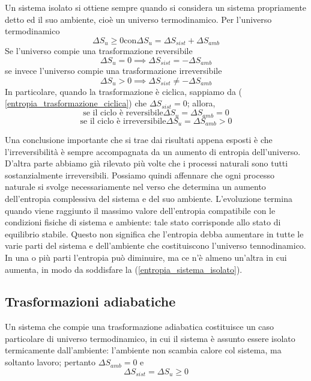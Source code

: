 \documentclass[class=book, crop=false, oneside, 12pt]{standalone}
\begin{document}
Un sistema isolato si ottiene sempre quando si considera un sistema propriamente detto ed il suo ambiente, cioè un universo termodinamico. 
Per l'universo termodinamico
\begin{equation*}
    \Delta S_u \geq 0 \text{con} \Delta S_u = \Delta S_{sist} + \Delta S_{amb}
\end{equation*}
Se l'universo compie una trasformazione reversibile 
\begin{equation*}
    \Delta S_u = 0 \implies \Delta S_{sist} = - \Delta S_{amb}
\end{equation*}
se invece l'universo compie una trasformazione irreversibile
\begin{equation*}
    \Delta S_u > 0 \implies \Delta S_{sist} \neq -\Delta S_{amb}
\end{equation*}
In particolare, quando la trasformazione è ciclica, sappiamo da ( \ref{entropia_trasformazione_ciclica}) che \(\Delta S_{sist}  =0\); allora,
\begin{equation*}
    \text{se il ciclo è reversibile} \Delta S_u = \Delta S_{amb} = 0
\end{equation*}
\begin{equation*}
    \text{se il ciclo è irreversibile} \Delta S_u = \Delta S_{amb} > 0 
\end{equation*}

Una conclusione importante che si trae dai risultati appena esposti è che l'irreversibilità è sempre accompagnata da un aumento di entropia dell'universo. 
D'altra parte abbiamo già rilevato più volte che i processi naturali sono tutti sostanzialmente irreversibili. 
Possiamo quindi affennare che ogni processo naturale si svolge necessariamente nel verso che determina un aumento dell'entropia complessiva del sistema e del suo ambiente. 
L'evoluzione termina quando viene raggiunto il massimo valore dell'entropia compatibile con le condizioni fisiche di sistema e ambiente: tale stato corrisponde allo stato di equilibrio stabile.
Questo non significa che l'entropia debba aumentare in tutte le varie parti del sistema e dell'ambiente che costituiscono l'universo tennodinamico. 
In una o più parti l'entropia può diminuire, ma ce n'è almeno un'altra in cui aumenta, in modo da soddisfare la (\ref{entropia_sistema_isolato}).

\subsection{Trasformazioni adiabatiche}

Un sistema che compie una trasformazione adiabatica costituisce un caso particolare di universo termodinamico, in cui il sistema è assunto essere isolato termicamente dall'ambiente: l'ambiente non scambia calore col sistema, ma soltanto lavoro; pertanto \(\Delta S_{amb} = 0\) e 
\begin{equation*}
    \Delta S_{sist} = \Delta S_u \geq 0 
\end{equation*}
\end{document}
